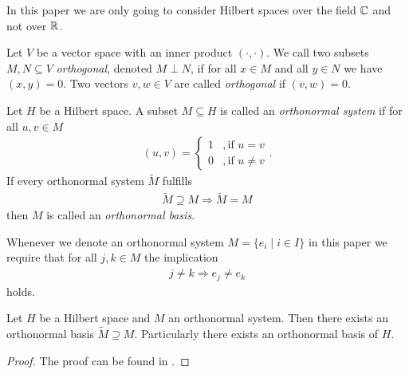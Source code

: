 In this paper we are only going to consider Hilbert spaces over the field $\mathbb{C}$ and not over $\mathbb{R}$. 

\begin{definition}
	Let $V$ be a vector space with an inner product $(\cdot, \cdot)$. We call two subsets $M,N \subseteq V$ \textit{orthogonal}, denoted $M \perp N$, if for all $x \in M$ and all $y \in N$ we have $(x,y) = 0$. Two vectors $v,w \in V$ are called \textit{orthogonal} if $(v,w) = 0$. 
\end{definition}

\begin{definition}
	Let $H$ be a Hilbert space. A subset $M \subseteq H$ is called an \textit{orthonormal system} if for all $u,v \in M$
	\begin{align*}
		(u,v) = 
		\begin{cases}
			1 &, \text{if } u = v \\
			0 &, \text{if } u \neq v
		\end{cases}.
	\end{align*}
	If every orthonormal system $\tilde{M}$ fulfills
	\begin{align*}
		\tilde{M} \supseteq M \Rightarrow \tilde{M} = M
	\end{align*}
	then $M$ is called an \textit{orthonormal basis}.
\end{definition}

\begin{remark}
	Whenever we denote an orthonormal system $M = \{e_i \mid i \in I\}$ in this paper we require that for all $j,k \in M$ the implication
	\begin{align*}
		j \neq k \Rightarrow e_j \neq e_k
	\end{align*}
	holds.
\end{remark}

\begin{lemma}\label{lemma:onb}
	Let $H$ be a Hilbert space and $M$ an orthonormal system. Then there exists an orthonormal basis $\tilde{M} \supseteq M$. Particularly there exists an orthonormal basis of $H$. 
\end{lemma}

\begin{proof}
	The proof can be found in \cite[p.52]{FAna1}.
\end{proof}


